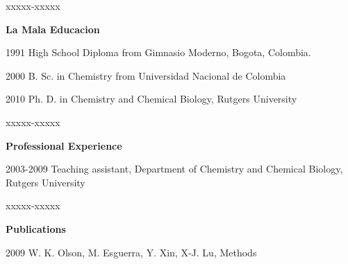 \begin{vita}
 \vspace{15pt}
\begin{descriptionlist}{xxxxx-xxxxx} %
\item[{\bf La Mala Educacion}] \mbox{}
\item[1991] High School Diploma from Gimnasio Moderno, Bogota, Colombia.
\item[2000] B. Sc. in Chemistry from Universidad Nacional de Colombia
\item[2010] Ph. D. in Chemistry and Chemical Biology, Rutgers University
\end{descriptionlist}
\medskip
\begin{descriptionlist}{xxxxx-xxxxx} %
\item[{\bf Professional Experience}] \mbox{}
\item[2003-2009] Teaching assistant, Department of Chemistry and
  Chemical Biology, Rutgers University
\end{descriptionlist}
\medskip
\begin{descriptionlist}{xxxxx-xxxxx} %
\item[{\bf Publications}] \mbox{}
\item[2009] W. K. Olson, M. Esguerra, Y. Xin, X-J. Lu, Methods
\end{descriptionlist}

\end{vita} 



